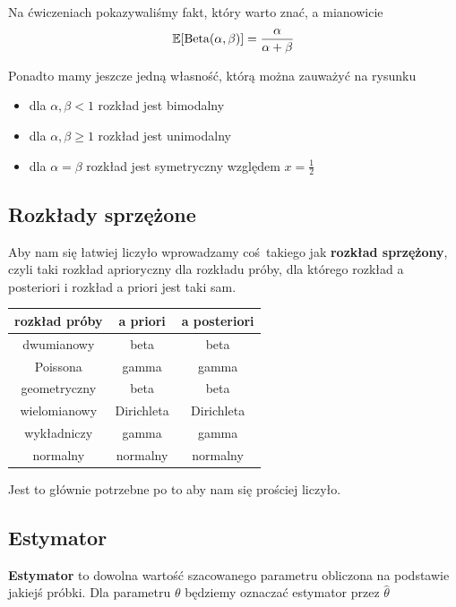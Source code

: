 Na ćwiczeniach pokazywaliśmy fakt, który warto znać, a mianowicie
\[
    \expected{\Beta(\alpha, \beta)} = \frac{\alpha}{\alpha + \beta}
\]

Ponadto mamy jeszcze jedną własność, którą można zauważyć na rysunku
\begin{itemize}
    \item dla \( \alpha, \beta < 1 \) rozkład jest bimodalny 
    \item dla \( \alpha, \beta \geq 1 \) rozkład jest unimodalny
    \item dla \( \alpha = \beta \) rozkład jest symetryczny względem \( x = \frac{1}{2} \)
\end{itemize}

\subsection{Rozkłady sprzężone}
Aby nam się łatwiej liczyło wprowadzamy coś takiego jak \textbf{rozkład sprzężony}, czyli taki rozkład aprioryczny dla rozkładu próby, dla którego rozkład a posteriori i rozkład a priori jest taki sam.

\begin{center}
    \begin{tabular}{c c c}
         rozkład próby & a priori & a posteriori  \\
         \hline
         dwumianowy & beta & beta \\
         Poissona & gamma & gamma \\
         geometryczny & beta & beta \\
         wielomianowy & Dirichleta & Dirichleta \\
         wykładniczy & gamma & gamma \\
         normalny & normalny & normalny \\
    \end{tabular}
\end{center}

Jest to głównie potrzebne po to aby nam się prościej liczyło.

\subsection{Estymator}

\begin{definition}
\textbf{Estymator} to dowolna wartość szacowanego parametru obliczona na podstawie jakiejś próbki. Dla parametru \( \theta \) będziemy oznaczać estymator przez \( \widehat \theta \)
\end{definition}

